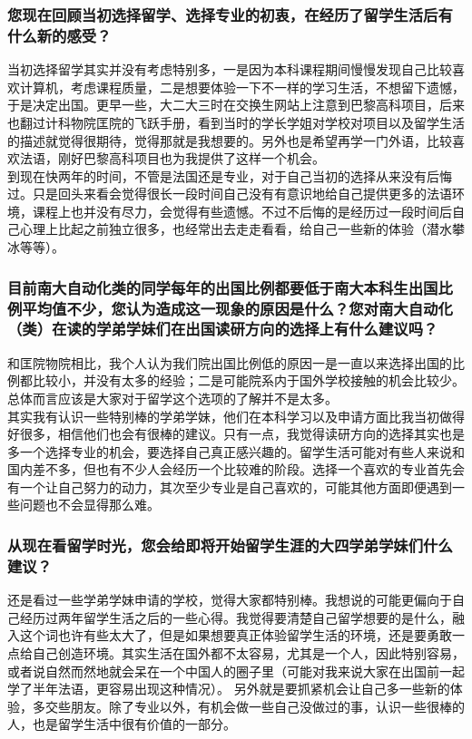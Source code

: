 \documentclass[a4paper,UTF8]{book}
\begin{document}
    \subsubsection*{您现在回顾当初选择留学、选择专业的初衷，在经历了留学生活后有什么新的感受？}
    当初选择留学其实并没有考虑特别多，一是因为本科课程期间慢慢发现自己比较喜欢计算机，考虑课程质量，二是想要体验一下不一样的学习生活，不想留下遗憾，于是决定出国。更早一些，大二大三时在交换生网站上注意到巴黎高科项目，后来也翻过计科物院匡院的飞跃手册，看到当时的学长学姐对学校对项目以及留学生活的描述就觉得很期待，觉得那就是我想要的。另外也是希望再学一门外语，比较喜欢法语，刚好巴黎高科项目也为我提供了这样一个机会。\\
    到现在快两年的时间，不管是法国还是专业，对于自己当初的选择从来没有后悔过。只是回头来看会觉得很长一段时间自己没有有意识地给自己提供更多的法语环境，课程上也并没有尽力，会觉得有些遗憾。不过不后悔的是经历过一段时间后自己心理上比起之前独立很多，也经常出去走走看看，给自己一些新的体验（潜水攀冰等等）。

    \subsubsection*{目前南大自动化类的同学每年的出国比例都要低于南大本科生出国比例平均值不少，您认为造成这一现象的原因是什么？您对南大自动化（类）在读的学弟学妹们在出国读研方向的选择上有什么建议吗？}
    和匡院物院相比，我个人认为我们院出国比例低的原因一是一直以来选择出国的比例都比较小，并没有太多的经验；二是可能院系内于国外学校接触的机会比较少。总体而言应该是大家对于留学这个选项的了解并不是太多。\\
    其实我有认识一些特别棒的学弟学妹，他们在本科学习以及申请方面比我当初做得好很多，相信他们也会有很棒的建议。只有一点，我觉得读研方向的选择其实也是多一个选择专业的机会，要选择自己真正感兴趣的。留学生活可能对有些人来说和国内差不多，但也有不少人会经历一个比较难的阶段。选择一个喜欢的专业首先会有一个让自己努力的动力，其次至少专业是自己喜欢的，可能其他方面即便遇到一些问题也不会显得那么难。
    
    \subsubsection*{从现在看留学时光，您会给即将开始留学生涯的大四学弟学妹们什么建议？}
    还是看过一些学弟学妹申请的学校，觉得大家都特别棒。我想说的可能更偏向于自己经历过两年留学生活之后的一些心得。我觉得要清楚自己留学想要的是什么，融入这个词也许有些太大了，但是如果想要真正体验留学生活的环境，还是要勇敢一点给自己创造环境。其实生活在国外都不太容易，尤其是一个人，因此特别容易，或者说自然而然地就会呆在一个中国人的圈子里（可能对我来说大家在出国前一起学了半年法语，更容易出现这种情况）。
    另外就是要抓紧机会让自己多一些新的体验，多交些朋友。除了专业以外，有机会做一些自己没做过的事，认识一些很棒的人，也是留学生活中很有价值的一部分。
\end{document}
